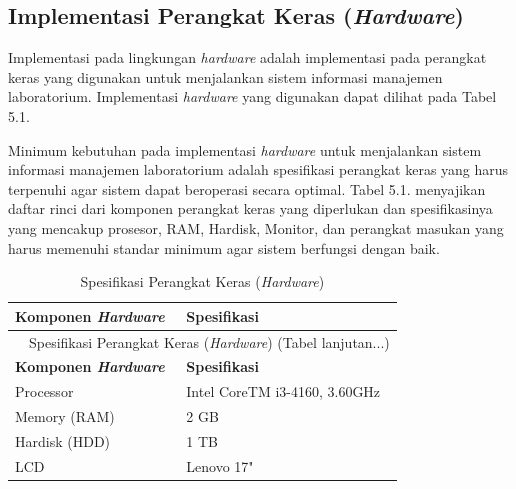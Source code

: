 \subsection{Implementasi Perangkat Keras (\textit{Hardware})}
Implementasi pada lingkungan \textit{hardware} adalah implementasi pada perangkat keras yang digunakan untuk menjalankan sistem informasi manajemen laboratorium. Implementasi \textit{hardware} yang digunakan dapat dilihat pada Tabel 5.1.

Minimum kebutuhan pada implementasi \textit{hardware} untuk menjalankan sistem informasi manajemen laboratorium adalah spesifikasi perangkat keras yang harus terpenuhi agar sistem dapat beroperasi secara optimal. Tabel 5.1. menyajikan daftar rinci dari komponen perangkat keras yang diperlukan dan spesifikasinya yang mencakup prosesor, RAM, Hardisk, Monitor, dan perangkat masukan yang harus memenuhi standar minimum agar sistem berfungsi dengan baik.

\begin{longtable}{l l}
	\caption{Spesifikasi Perangkat Keras (\textit{Hardware})}                                                               \\
	\hline
	\textbf{ Komponen \textit{Hardware}} & \textbf{ Spesifikasi}                                                            \\
	\hline
	\endfirsthead

	\multicolumn{2}{c}{\tablename\ \thetable\ {Spesifikasi Perangkat Keras (\textit{Hardware})} \space (Tabel lanjutan...)} \\
	\hline
	\textbf{ Komponen \textit{Hardware}} & \textbf{ Spesifikasi}                                                            \\
	\hline
	\endhead

	Processor                            & Intel \textregistered{} CoreTM i3-4160, 3.60GHz                                  \\
	Memory (RAM)                         & 2 GB                                                                             \\
	Hardisk (HDD)                        & 1 TB                                                                             \\
	LCD                                  & Lenovo 17"                                                                       \\
	\hline
\end{longtable}

